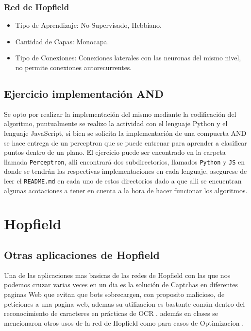 \documentclass{article}
\begin{document}
\subsubsection{Red de Hopfield}
\begin{itemize}
	\item Tipo de Aprendizaje: No-Supervisado, Hebbiano.
	\item Cantidad de Capas: Monocapa.
	\item Tipo de Conexiones: Conexiones laterales con las neuronas del mismo
		nivel, no permite conexiones autorecurrentes.
\end{itemize}


\subsection{Ejercicio implementación AND}
Se opto por realizar la implementación del mismo mediante la codificación del
algoritmo, puntualmente se realizo la actividad con el lenguaje Python y el
lenguaje JavaScript, si bien se solicita la implementación de una compuerta AND
se hace entrega de un perceptron que se puede entrenar para aprender a
clasificar puntos dentro de un plano. El ejercicio puede ser encontrado en la
carpeta llamada \texttt{Perceptron}, alli encontrará dos subdirectorios,
llamados \texttt{Python} y \texttt{JS} en donde se tendrán las respectivas
implementaciones en cada lenguaje, asegurese de leer el \texttt{README.md} en
cada uno de estos directorios dado a que alli se encuentran algunas acotaciones
a tener en cuenta a la hora de hacer funcionar los algoritmos.

\section{Hopfield}
{\label{sec:hopfield}}

\subsection{Otras aplicaciones de Hopfield}
Una de las aplicaciones mas basicas de las redes de Hopfield con las que nos
podemos cruzar varias veces en un dia es la solución de Captchas en diferentes
paginas Web que evitan que bots sobrecargen, con proposito malicioso, de
peticiones a una pagina web, ademas su utilizacion es bastante común dentro del
reconocimiento de caracteres en prácticas de OCR \cite{hopfield1}. además en
clases se mencionaron otros usos de la red de Hopfield como para casos de
Optimizacion \cite{ia-hopfield}.
\end{document}

